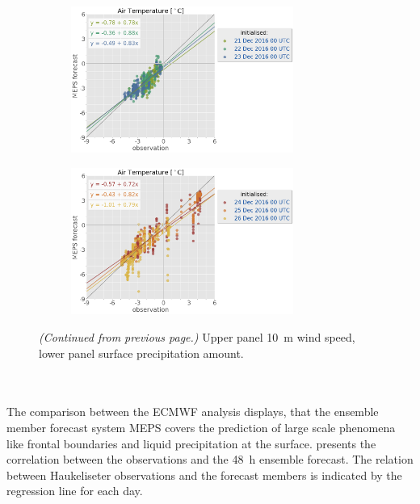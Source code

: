 \begin{figure}
\begin{subfigure}[b]{0.49\textwidth}
		\caption{}\label{fig:scat:precip2426}
	\end{subfigure}
	\begin{subfigure}[b]{0.49\textwidth}
		\centering
		\includegraphics[trim={25.cm 15.5cm 0cm 3.6cm},clip,
		width=0.8\textwidth]{./fig_sfc_temp/obs_model_20161221_23_00}
	\end{subfigure}
	\begin{subfigure}[b]{0.49\textwidth}
		\centering
		\includegraphics[trim={25.cm 15.5cm 0cm 3.6cm},clip,
		width=0.8\textwidth]{./fig_sfc_temp/obs_model_20161224_26_00}
	\end{subfigure}
	\caption{\textit{(Continued from previous page.)} Upper panel \SI{10}{\metre} wind speed, lower panel surface precipitation amount. }
\end{figure}
\\
\\
The comparison between the ECMWF analysis displays, that the ensemble member forecast system MEPS covers the prediction of large scale phenomena like frontal boundaries and liquid precipitation at the surface.  presents the correlation between the observations and the \SI{48}{\hour} ensemble forecast. The relation between Haukeliseter observations and the forecast members is indicated by the regression line for each day.
